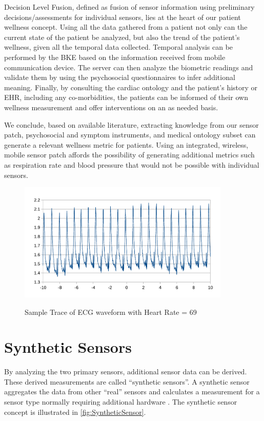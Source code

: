 Decision Level Fusion, defined as fusion of sensor information using preliminary decisions/assessments for individual sensors, lies at the heart of our patient wellness concept. Using all the data gathered from a patient not only can the current state of the patient be analyzed, but also the trend of the patient's wellness, given all the temporal data collected. Temporal analysis can be performed by the BKE based on the information received from mobile communication device. The server can then analyze the biometric readings and validate them by using the psychosocial questionnaires to infer additional meaning. Finally, by consulting the cardiac ontology and the patient's history or EHR, including any co-morbidities, the patients can be informed of their own wellness measurement and offer interventions on an as needed basis. 

We conclude, based on available literature, extracting knowledge from our sensor patch, psychosocial and symptom instruments, and medical ontology subset can generate a relevant wellness metric for patients. Using an integrated, wireless, mobile sensor patch affords the possibility of generating additional metrics such as respiration rate and blood pressure that would not be possible with individual sensors.

\begin{figure}
	\begin{center}
		\label{fig:HR69}
		\includegraphics[scale=1,width=0.9\textwidth]{Images/HR69.pdf} 
		\caption{Sample Trace of ECG waveform with Heart Rate = 69}
	\end{center}
\end{figure}

\section{Synthetic Sensors}
\label{sec:SyntheticSensors}
By analyzing the two primary sensors, additional sensor data can be derived.  These derived measurements are called “synthetic sensors”. A synthetic sensor aggregates the data from other “real” sensors and calculates a measurement for a sensor type normally requiring additional hardware \cite{Fortier2009}. The synthetic sensor concept is illustrated in \cref{fig:SyntheticSensor}.

